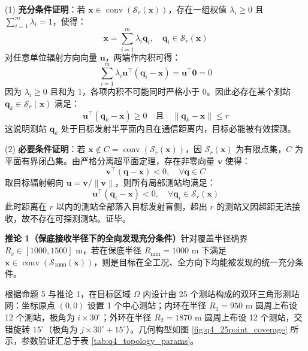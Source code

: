 \documentclass[zihao=-4,a4paper,UTF8]{ctexart}
\begin{document}
\begin{cumcmproof}
(1) \textbf{充分条件证明}：若 $\mathbf{x} \in \operatorname{conv}(\mathcal{S}_r(\mathbf{x}))$，存在一组权值 $\lambda_i \ge 0$ 且 $\sum_{i=1}^m \lambda_i = 1$，使得：
\begin{equation}
    \mathbf{x} = \sum_{i=1}^m \lambda_i \mathbf{q}_i, \quad \mathbf{q}_i \in \mathcal{S}_r(\mathbf{x})
\end{equation}
对任意单位辐射方向向量 $\mathbf{u}$，两端作内积可得：
\begin{equation}
    \sum_{i=1}^m \lambda_i \mathbf{u}^\top (\mathbf{q}_i - \mathbf{x}) = \mathbf{u}^\top \mathbf{0} = 0
\end{equation}
因为 $\lambda_i \ge 0$ 且和为 1，各项内积不可能同时严格小于 0。因此必存在某个测站 $\mathbf{q}_k \in \mathcal{S}_r(\mathbf{x})$ 满足：
\begin{equation}
    \mathbf{u}^\top (\mathbf{q}_k - \mathbf{x}) \ge 0 \quad \text{且} \quad \|\mathbf{q}_k - \mathbf{x}\| \le r
\end{equation}
这说明测站 $\mathbf{q}_k$ 处于目标发射半平面内且在通信距离内，目标必能被有效探测。

(2) \textbf{必要条件证明}：若 $\mathbf{x} \notin C = \operatorname{conv}(\mathcal{S}_r(\mathbf{x}))$，因 $\mathcal{S}_r(\mathbf{x})$ 为有限点集，$C$ 为平面有界闭凸集。由严格分离超平面定理，存在非零向量 $\mathbf{v}$ 使得：
\begin{equation}
    \mathbf{v}^\top (\mathbf{q} - \mathbf{x}) < 0, \quad \forall \mathbf{q} \in C
\end{equation}
取目标辐射朝向 $\mathbf{u} = \mathbf{v} / \|\mathbf{v}\|$，则所有局部测站均满足：
\begin{equation}
    \mathbf{u}^\top (\mathbf{q}_i - \mathbf{x}) < 0, \quad \forall \mathbf{q}_i \in \mathcal{S}_r(\mathbf{x})
\end{equation}
此时距离在 $r$ 以内的测站全部落入目标发射盲侧，超出 $r$ 的测站又因超距无法接收，故不存在可探测测站。证毕。
\end{cumcmproof}

\noindent\textbf{推论 1（保底接收半径下的全向发现充分条件）}\quad 针对覆盖半径确界 $R_c \in [1000, 1500]\text{ m}$，若在保底半径 $R_{\min} = 1000\text{ m}$ 下满足 $\mathbf{x} \in \operatorname{conv}(\mathcal{S}_{1000}(\mathbf{x}))$，则是目标在全工况、全方向下均能被发现的统一充分条件。

根据命题 5 与推论 1，在目标区域 $\Omega$ 内设计由 25 个测站构成的双环三角形测站网：坐标原点 $(0, 0)$ 设置 1 个中心测站；内环在半径 $R_1 = 950\text{ m}$ 圆周上布设 12 个测站，极角为 $i \times 30^\circ$；外环在半径 $R_2 = 1870\text{ m}$ 圆周上布设 12 个测站，交错旋转 $15^\circ$（极角为 $j \times 30^\circ + 15^\circ$）。几何构型如图 \ref{fig:q4_25point_coverage} 所示，参数验证汇总于表 \ref{tab:q4_topology_params}。
\end{document}
